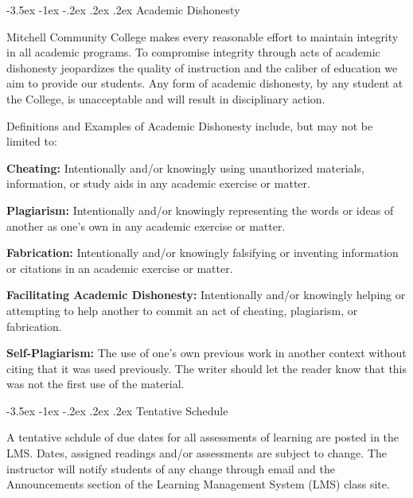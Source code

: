 \documentclass{article}
\makeatletter
\renewcommand\section{\@startsection{section}{1}{0pt}%
  {-3.5ex \@plus -1ex \@minus -.2ex}%
  {.2ex \@plus.2ex}%
  {\normalfont\Large\bfseries}} %
\makeatother
\begin{document}
\section{Academic Dishonesty}

Mitchell Community College makes every reasonable effort to maintain integrity in all academic programs. To compromise integrity through acts of academic dishonesty jeopardizes the quality of instruction and the caliber of education we aim to provide our students.  Any form of academic dishonesty, by any student at the College, is unacceptable and will result in disciplinary action.

Definitions and Examples of Academic Dishonesty include, but may not be limited to:

\textbf{Cheating:} Intentionally and/or knowingly using unauthorized materials, information, or study aids in any academic exercise or matter.

\textbf{Plagiarism:} Intentionally and/or knowingly representing the words or ideas of another as one's own in any academic exercise or matter.

\textbf{Fabrication:} Intentionally and/or knowingly falsifying or inventing information or citations in an academic exercise or matter.

\textbf{Facilitating Academic Dishonesty:} Intentionally and/or knowingly helping or attempting to help another to commit an act of cheating, plagiarism, or fabrication.

\textbf{Self-Plagiarism:} The use of one's own previous work in another context without citing that it was used previously. The writer should let the reader know that this was not the first use of the material.

\section{Tentative Schedule}

A tentative schdule of due dates for all assessments of learning are posted in the LMS. Dates, assigned readings and/or assessments are subject to change. The instructor will notify students of any change through email and the Announcements section of the Learning Management System (LMS) class site.
\end{document}
